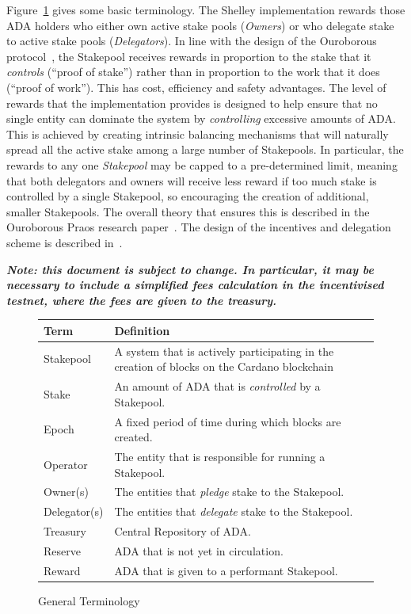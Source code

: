 \documentclass[11pt,a4paper,dvipsnames,twosided,final]{article}
\newcommand{\khcomment}[1]{\todo[color=blue!20]{KH: #1}}
\newcommand{\ada}{ADA{}}
\newcommand{\cardano}[1]{Cardano}
\begin{document}
Figure~\ref{fig:terminology} gives some basic terminology.
The Shelley implementation rewards those \ada{} holders who either own active stake pools
(\emph{Owners}) or who delegate stake to active stake pools (\emph{Delegators}).
In line with the design of the Ouroborous protocol~\cite{ouroboros_classic}, the Stakepool receives
rewards in proportion to the stake that it \emph{controls} (``proof of
stake'') rather than in proportion to the work that it does (``proof of work'').
This has cost, efficiency and safety advantages.
The level of rewards that the implementation provides is designed to help ensure that no single entity can
dominate the system by \emph{controlling} excessive amounts of \ada{}.  This is achieved by creating intrinsic
balancing mechanisms that will naturally spread all the active stake among a large number of Stakepools.
In particular, the rewards to any one \emph{Stakepool} may be capped to a pre-determined limit,
meaning that both delegators and owners will receive less reward if too much stake is controlled by a single Stakepool,
so encouraging the creation of additional, smaller Stakepools.
The overall theory that ensures this is described in the Ouroborous Praos research
paper~\cite{ouroboros_praos}. The design of the incentives and delegation scheme is described
in~\cite{delegation_design}.

\textbf{\emph{Note: this document is subject to change.  In particular, it may be necessary to include a simplified fees calculation
  in the incentivised testnet, where the fees are given to the treasury\khcomment{Check fees.}.}}

\begin{figure}[t]
  \begin{center}
\begin{tabular}{||l|p{12cm}||}
  \hline \hline
\textbf{Term} & \textbf{Definition} \\\hline
  Stakepool & A system that is actively participating in the creation of blocks on the \cardano{} blockchain  \\\hline
  Stake & An amount of \ada{} that is \emph{controlled} by a Stakepool.\\\hline
  Epoch & A fixed period of time during which blocks are created.\\\hline
Operator & The entity that is responsible for running a Stakepool. \\\hline
Owner(s) & The entities that \emph{pledge} stake to the Stakepool. \\\hline
  Delegator(s) & The entities that \emph{delegate} stake to the Stakepool.\\\hline
  Treasury & Central Repository of \ada.\\\hline
  Reserve & \ada{} that is not yet in circulation.\\\hline
  Reward & \ada{} that is given to a performant Stakepool.\\\hline
  \hline
\end{tabular}
\end{center}
\caption{General Terminology}
\label{fig:terminology}
\end{figure}
\end{document}
